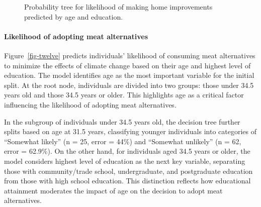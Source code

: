 \documentclass[
  letterpaper,
  DIV=11,
  numbers=noendperiod]{scrartcl}
\let\oldparagraph\paragraph
\renewcommand{\paragraph}[1]{\oldparagraph{#1}\mbox{}}
\begin{document}
\begin{figure}


\caption{\label{fig-eleven}Probability tree for likelihood of making
home improvements predicted by age and education.}

\end{figure}%

\paragraph{Likelihood of adopting meat
alternatives}\label{likelihood-of-adopting-meat-alternatives}

Figure~\ref{fig-twelve} predicts individuals' likelihood of consuming
meat alternatives to minimize the effects of climate change based on
their age and highest level of education. The model identifies age as
the most important variable for the initial split. At the root node,
individuals are divided into two groups: those under 34.5 years old and
those 34.5 years or older. This highlights age as a critical factor
influencing the likelihood of adopting meat alternatives.

In the subgroup of individuals under 34.5 years old, the decision tree
further splits based on age at 31.5 years, classifying younger
individuals into categories of ``Somewhat likely'' (n = 25, error =
44\%) and ``Somewhat unlikely'' (n = 62, error = 62.9\%). On the other
hand, for individuals aged 34.5 years or older, the model considers
highest level of education as the next key variable, separating those
with community/trade school, undergraduate, and postgraduate education
from those with high school education. This distinction reflects how
educational attainment moderates the impact of age on the decision to
adopt meat alternatives.
\end{document}
